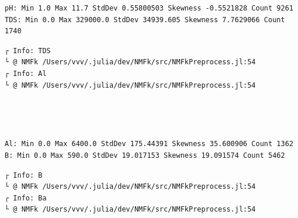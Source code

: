 \documentclass[11pt]{article}
\begin{document}
    \begin{Verbatim}[commandchars=\\\{\}]
pH: Min 1.0 Max 11.7 StdDev 0.55800503 Skewness -0.5521828 Count 9261
TDS: Min 0.0 Max 329000.0 StdDev 34939.605 Skewness 7.7629066 Count 1740
    \end{Verbatim}

    \begin{Verbatim}[commandchars=\\\{\}]
┌ Info: TDS
└ @ NMFk /Users/vvv/.julia/dev/NMFk/src/NMFkPreprocess.jl:54
┌ Info: Al
└ @ NMFk /Users/vvv/.julia/dev/NMFk/src/NMFkPreprocess.jl:54
    \end{Verbatim}

    \begin{center}
    \end{center}
    { \hspace*{\fill} \\}
    
    \begin{center}
    \end{center}
    { \hspace*{\fill} \\}
    
    \begin{Verbatim}[commandchars=\\\{\}]
Al: Min 0.0 Max 6400.0 StdDev 175.44391 Skewness 35.600906 Count 1362
B: Min 0.0 Max 590.0 StdDev 19.017153 Skewness 19.091574 Count 5462
    \end{Verbatim}

    \begin{Verbatim}[commandchars=\\\{\}]
┌ Info: B
└ @ NMFk /Users/vvv/.julia/dev/NMFk/src/NMFkPreprocess.jl:54
┌ Info: Ba
└ @ NMFk /Users/vvv/.julia/dev/NMFk/src/NMFkPreprocess.jl:54
    \end{Verbatim}

    \begin{center}
    \end{center}
    { \hspace*{\fill} \\}
    
    \begin{center}
    \end{center}
    { \hspace*{\fill} \\}
    
\end{document}
